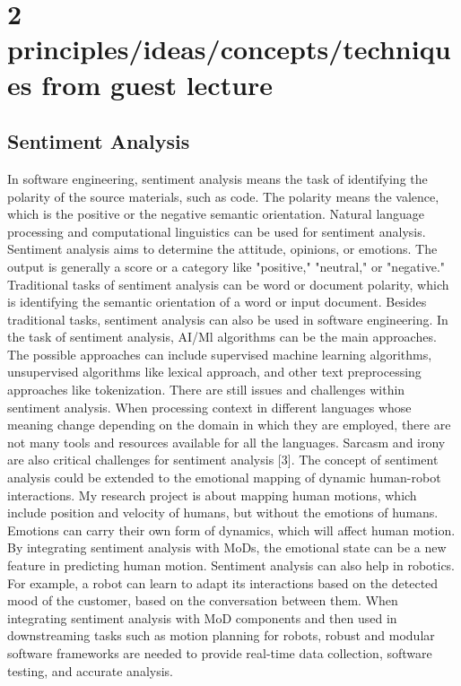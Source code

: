\documentclass[11pt]{article}
\begin{document}
\section{2 principles/ideas/concepts/techniques from guest lecture}

\subsection{Sentiment Analysis}
In software engineering, sentiment analysis means the task of identifying the polarity of the source materials, such as code. The polarity means the valence, which is the positive or the negative semantic orientation. Natural language processing and computational linguistics can be used for sentiment analysis.  Sentiment analysis aims to determine the attitude, opinions, or emotions. The output is generally a score or a category like "positive," "neutral," or "negative." Traditional tasks of sentiment analysis can be word or document polarity, which is identifying the semantic orientation of a word or input document. Besides traditional tasks, sentiment analysis can also be used in software engineering. In the task of sentiment analysis, AI/Ml algorithms can be the main approaches. The possible approaches can include supervised machine learning algorithms, unsupervised algorithms like lexical approach, and other text preprocessing approaches like tokenization. There are still issues and challenges within sentiment analysis. When processing context in different languages whose meaning change depending on the domain in which they are employed, there are not many tools and resources available for all the languages. Sarcasm and irony are also critical challenges for sentiment analysis [3]. The concept of sentiment analysis could be extended to the emotional mapping of dynamic human-robot interactions. My research project is about mapping human motions, which include position and velocity of humans, but without the emotions of humans. Emotions can carry their own form of dynamics, which will affect human motion. By integrating sentiment analysis with MoDs, the emotional state can be a new feature in predicting human motion. Sentiment analysis can also help in robotics. For example, a robot can learn to adapt its interactions based on the detected mood of the customer, based on the conversation between them. When integrating sentiment analysis with MoD components and then used in downstreaming tasks such as motion planning for robots, robust and modular software frameworks are needed to provide real-time data collection, software testing, and accurate analysis. 
\end{document}

